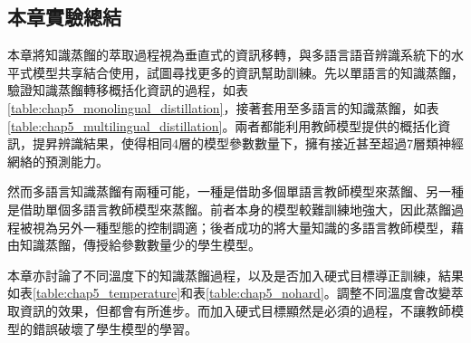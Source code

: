 \subsection{本章實驗總結}    

本章將知識蒸餾的萃取過程視為垂直式的資訊移轉，與多語言語音辨識系統下的水平式模型共享結合使用，試圖尋找更多的資訊幫助訓練。先以單語言的知識蒸餾，驗證知識蒸餾轉移概括化資訊的過程，如表\ref{table:chap5_monolingual_distillation}，接著套用至多語言的知識蒸餾，如表\ref{table:chap5_multilingual_distillation}。兩者都能利用教師模型提供的概括化資訊，提昇辨識結果，使得相同4層的模型參數數量下，擁有接近甚至超過7層類神經網絡的預測能力。

然而多語言知識蒸餾有兩種可能，一種是借助多個單語言教師模型來蒸餾、另一種是借助單個多語言教師模型來蒸餾。前者本身的模型較難訓練地強大，因此蒸餾過程被視為另外一種型態的控制調適；後者成功的將大量知識的多語言教師模型，藉由知識蒸餾，傳授給參數數量少的學生模型。

本章亦討論了不同溫度下的知識蒸餾過程，以及是否加入硬式目標導正訓練，結果如表\ref{table:chap5_temperature}和表\ref{table:chap5_nohard}。調整不同溫度會改變萃取資訊的效果，但都會有所進步。而加入硬式目標顯然是必須的過程，不讓教師模型的錯誤破壞了學生模型的學習。



